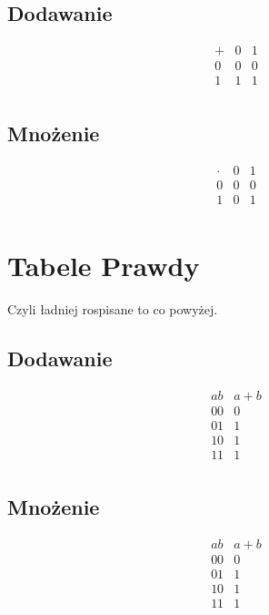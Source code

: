 \documentclass{article}
\begin{document}
\subsection{Dodawanie}
\[
\begin{array}{c|c|c}
    + & 0 & 1 \\
    \hline
    0 & 0 & 0 \\
    \hline
    1 & 1 & 1 \\
\end{array}
\]

\subsection{Mnożenie}
\[
    \begin{array}{c|c|c}
        \cdot & 0 & 1 \\
        \hline
        0 & 0 & 0 \\
        \hline
        1 & 0 & 1 \\
    \end{array}
\]

\section{Tabele Prawdy}
Czyli ładniej rospisane to co powyżej.
\subsection{Dodawanie}
\[
\begin{array}{c|c}
    a b & a + b \\
    \hline
    00 & 0 \\
    01 & 1 \\
    10 & 1 \\
    11 & 1 \\
\end{array}    
\]
\subsection{Mnożenie}
\[
\begin{array}{c|c}
    a b & a + b \\
    \hline
    00 & 0 \\
    01 & 1 \\
    10 & 1 \\
    11 & 1 \\
\end{array}    
\]
\end{document}
